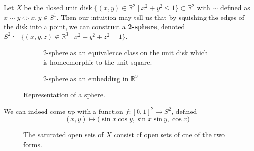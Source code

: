     \begin{example}[2-Sphere]
      Let $X$ be the closed unit disk $\{(x, y) \in \mathbb{R}^2 \mid x^2 + y^2 \leq 1\} \subset \mathbb{R}^2$ with $\sim$ defined as $x \sim y \iff x, y \in S^1$. Then our intuition may tell us that by squishing the edges of the disk into a point, we can construct a \textbf{2-sphere}, denoted $S^2 \coloneqq \{(x, y, z) \in \mathbb{R}^3 \mid x^2 + y^2 + z^2 = 1\}$. 

      \begin{figure}[H]
        \centering
        \begin{subfigure}[b]{0.48\textwidth}
          \centering
          \caption{2-sphere as an equivalence class on the unit disk which is homeomorphic to the unit square.}
          \label{fig:S2_disk}
        \end{subfigure}
        \hfill 
        \begin{subfigure}[b]{0.48\textwidth}
          \centering
          \caption{2-sphere as an embedding in $\mathbb{R}^3$.}
          \label{fig:S2_R3}
        \end{subfigure}
        \caption{Representation of a sphere.}
        \label{fig:2sphere}
      \end{figure}

      We can indeed come up with a function $f: [0,1]^2 \rightarrow S^2$, defined 
      \begin{equation}
        (x, y) \mapsto \big( \sin{x} \cos{y}, \sin{x} \sin{y}, \cos{x} \big)
      \end{equation}

      \begin{figure}[H]
        \centering 
        \caption{The saturated open sets of $X$ consist of open sets of one of the two forms. } 
        \label{fig:open_in_s2}
      \end{figure}
    \end{example} 

